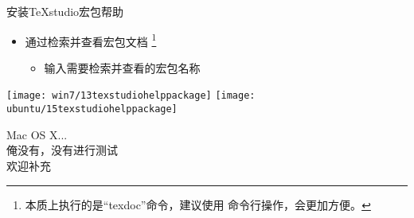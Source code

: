 \documentclass[fontset = none, t]{ctexbeamer}
\begin{document}
\begin{frame}{安装TeXstudio}{宏包帮助}
  \begin{spacing}{1.5}
    \begin{itemize}
    \item 通过检索并查看宏包文档
      \footnote[frame,1]{本质上执行的是\enquote{texdoc}命令，建议使用
        命令行操作，会更加方便。}%
      \begin{itemize}
      \item 输入需要检索并查看的\alert{宏包名称}%
      \end{itemize}
    \end{itemize}
    \begin{center}
      \texttt{[image: win7/13texstudiohelppackage]}
      \texttt{[image: ubuntu/15texstudiohelppackage]}      
    \end{center}
  \end{spacing}
\end{frame}

\begin{frame}
  Mac OS X...\\
  俺没有，没有进行测试\\
  欢迎补充
\end{frame}
\end{document}
